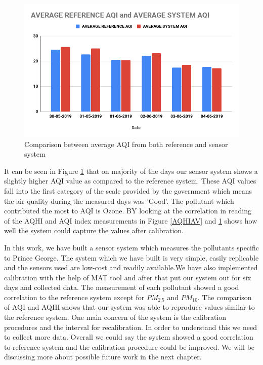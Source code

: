  \begin{figure}[h!]
  \begin{center}
  \includegraphics[scale=0.53]{images/figure92.png}
  \end{center}
  \caption{Comparison between average AQI from both reference and sensor system}
  \label{AQIAV}
  \hspace{1 cm}
\end{figure}

It can be seen in Figure \ref{AQIAV} that on majority of the days our sensor system shows a slightly higher AQI value as compared to the reference system. These AQI values fall into the first category of the scale provided by the government which means the air quality during the measured days was 'Good'. The pollutant which contributed the most to AQI is Ozone.
BY looking at the correlation in reading of the AQHI and AQI index measurements in Figure \ref{AQHIAV} and \ref{AQIAV} shows how well the system could capture the values after calibration. 


In this work, we have built a sensor system which measures the pollutants specific to Prince George. The system which we have built is very simple, easily replicable and the sensors used are low-cost and readily available.We have also implemented calibration with the help of MAT tool and after that put our system out for six days and collected data. The measurement of each pollutant showed a good correlation to the reference system except for $PM_{2.5}$ and $PM_{10}$. The comparison of AQI and AQHI shows that our system was able to reproduce values similar to the reference system. One main concern of the system is the calibration procedures and the interval for recalibration. In order to understand this we need to collect more data. Overall we could say the system showed a good correlation to reference system  and the calibration procedure could be improved. We will be discussing more about possible future work in the next chapter.
